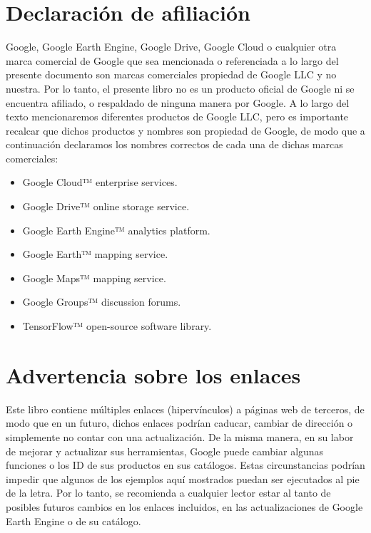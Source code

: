\documentclass[
  12pt,
  letterpaper,
  twoside]{book}
\providecommand{\tightlist}{%
  \setlength{\itemsep}{0pt}\setlength{\parskip}{0pt}}
\begin{document}
\newpage

\hypertarget{declaraciuxf3n-de-afiliaciuxf3n}{%
\chapter*{Declaración de afiliación}\label{declaraciuxf3n-de-afiliaciuxf3n}}

Google, Google Earth Engine, Google Drive, Google Cloud o cualquier otra marca comercial de Google que sea mencionada o referenciada a lo largo del presente documento son marcas comerciales propiedad de Google LLC y no nuestra. Por lo tanto, el presente libro no es un producto oficial de Google ni se encuentra afiliado, o respaldado de ninguna manera por Google.
A lo largo del texto mencionaremos diferentes productos de Google LLC, pero es importante recalcar que dichos productos y nombres son propiedad de Google, de modo que a continuación declaramos los nombres correctos de cada una de dichas marcas comerciales:

\begin{itemize}
\tightlist
\item
  Google Cloud™ enterprise services.
\item
  Google Drive™ online storage service.
\item
  Google Earth Engine™ analytics platform.
\item
  Google Earth™ mapping service.
\item
  Google Maps™ mapping service.
\item
  Google Groups™ discussion forums.
\item
  TensorFlow™ open-source software library.
\end{itemize}

\hypertarget{advertencia-sobre-los-enlaces}{%
\chapter*{Advertencia sobre los enlaces}\label{advertencia-sobre-los-enlaces}}

Este libro contiene múltiples enlaces (hipervínculos) a páginas web de terceros, de modo que en un futuro, dichos enlaces podrían caducar, cambiar de dirección o simplemente no contar con una actualización. De la misma manera, en su labor de mejorar y actualizar sus herramientas, Google puede cambiar algunas funciones o los ID de sus productos en sus catálogos. Estas circunstancias podrían impedir que algunos de los ejemplos aquí mostrados puedan ser ejecutados al pie de la letra. Por lo tanto, se recomienda a cualquier lector estar al tanto de posibles futuros cambios en los enlaces incluidos, en las actualizaciones de Google Earth Engine o de su catálogo.
\end{document}
